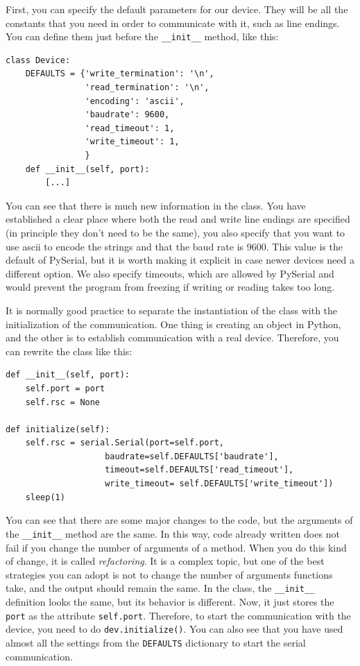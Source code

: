 First, you can specify the default parameters for our device. They will be all the constants that you need in order to communicate with it, such as line endings. You can define them just before the \texttt{__init__} method, like this:

\begin{verbatim}
class Device:
    DEFAULTS = {'write_termination': '\n',
                'read_termination': '\n',
                'encoding': 'ascii',
                'baudrate': 9600,
                'read_timeout': 1,
                'write_timeout': 1,
                }
    def __init__(self, port):
        [...]
\end{verbatim}

You can see that there is much new information in the class. You have established a clear place where both the read and write line endings are specified (in principle they don't need to be the same), you also specify that you want to use ascii to encode the strings and that the baud rate is 9600. This value is the default of PySerial, but it is worth making it explicit in case newer devices need a different option. We also specify timeouts, which are allowed by PySerial and would prevent the program from freezing if writing or reading takes too long.

It is normally good practice to separate the instantiation of the class with the initialization of the communication. One thing is creating an object in Python, and the other is to establish communication with a real device. Therefore, you can rewrite the class like this:

\begin{verbatim}
def __init__(self, port):
    self.port = port
    self.rsc = None

def initialize(self):
    self.rsc = serial.Serial(port=self.port,
                    baudrate=self.DEFAULTS['baudrate'],
                    timeout=self.DEFAULTS['read_timeout'],
                    write_timeout= self.DEFAULTS['write_timeout'])
    sleep(1)
\end{verbatim}

You can see that there are some major changes to the code, but the arguments of the \texttt{__init__} method are the same. In this way, code already written does not fail if you change the number of arguments of a method. When you do this kind of change, it is called \emph{refactoring}. It is a complex topic, but one of the best strategies you can adopt is not to change the number of arguments functions take, and the output should remain the same. In the class, the \texttt{__init__} definition looks the same, but its behavior is different. Now, it just stores the \texttt{port} as the attribute \texttt{self.port}. Therefore, to start the communication with the device, you need to do \texttt{dev.initialize()}. You can also see that you have used almost all the settings from the \texttt{DEFAULTS} dictionary to start the serial communication.

